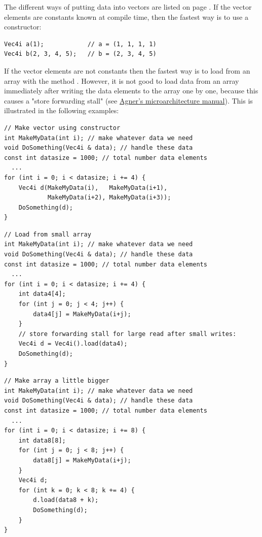\documentclass[vcl_manual.tex]{subfiles}
\begin{document}
The different ways of putting data into vectors are listed on page \pageref{ConstructingVectors}. If the vector elements are constants known at compile time, then the fastest way is to use a constructor:
\begin{example}
\label{exampleVectConstructor}
\end{example}
\begin{lstlisting}[frame=single]
Vec4i a(1);            // a = (1, 1, 1, 1)
Vec4i b(2, 3, 4, 5);   // b = (2, 3, 4, 5)
\end{lstlisting}

If the vector elements are not constants then the fastest way is to load from an array with the method . However, it is not good to load data from an array immediately after writing the data elements to the array one by one, because this causes a "store forwarding stall" (see \href{https://www.agner.org/optimize/#manual_cpp}{Agner's microarchitecture manual}). This is illustrated in the following examples:

\begin{example}
\label{exampleArrayLoopV}
\end{example}
\begin{lstlisting}[frame=single]
// Make vector using constructor
int MakeMyData(int i); // make whatever data we need
void DoSomething(Vec4i & data); // handle these data
const int datasize = 1000; // total number data elements
  ...
for (int i = 0; i < datasize; i += 4) {
    Vec4i d(MakeMyData(i),   MakeMyData(i+1),
            MakeMyData(i+2), MakeMyData(i+3));
    DoSomething(d);
}
\end{lstlisting}


\begin{example}
\label{exampleArrayLoopW}
\end{example}
\begin{lstlisting}[frame=single]
// Load from small array
int MakeMyData(int i); // make whatever data we need
void DoSomething(Vec4i & data); // handle these data
const int datasize = 1000; // total number data elements
  ...
for (int i = 0; i < datasize; i += 4) {
    int data4[4];
    for (int j = 0; j < 4; j++) {
        data4[j] = MakeMyData(i+j); 
    }
    // store forwarding stall for large read after small writes:
    Vec4i d = Vec4i().load(data4);
    DoSomething(d);
}
\end{lstlisting}


\begin{example}
\label{exampleArrayLoopX}
\end{example}
\begin{lstlisting}[frame=single]
// Make array a little bigger
int MakeMyData(int i); // make whatever data we need
void DoSomething(Vec4i & data); // handle these data
const int datasize = 1000; // total number data elements
  ...
for (int i = 0; i < datasize; i += 8) {
    int data8[8];
    for (int j = 0; j < 8; j++) {
        data8[j] = MakeMyData(i+j); 
    }
    Vec4i d;
    for (int k = 0; k < 8; k += 4) {
        d.load(data8 + k);
        DoSomething(d);
    }
}
\end{lstlisting}
\end{document}
